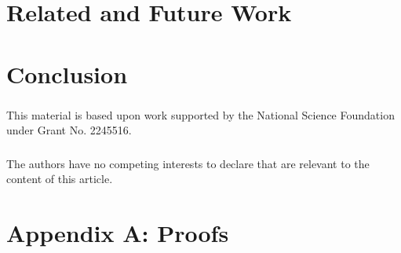 \documentclass[runningheads]{llncs}
\begin{document}

% 

\section{Related and Future Work} \label{sec-future}

\section{Conclusion} \label{sec-conclusion}

\begin{credits}
\subsubsection{\ackname}
% 
This material is based upon work supported by the National Science Foundation
under Grant No. 2245516.

\subsubsection{\discintname}
%
The authors have no competing interests to declare that are
relevant to the content of this article.
\end{credits}
%
%
%



\section{Appendix A: Proofs}

\end{document}
